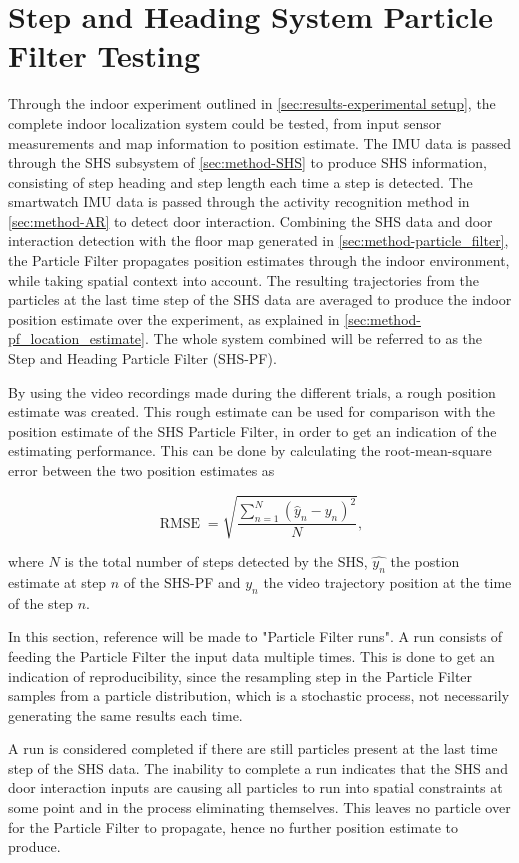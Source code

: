 \section[SHS-PF Testing]{Step and Heading System Particle Filter Testing}
\label{sec:results-SHSPF}
Through the indoor experiment outlined in \cref{sec:results-experimental setup}, the complete indoor localization system could be tested, from input sensor measurements and map information to position estimate. The IMU data is passed through the \ac{SHS} subsystem of \cref{sec:method-SHS} to produce \ac{SHS} information, consisting of step heading and step length each time a step is detected. The smartwatch IMU data is passed through the activity recognition method in \cref{sec:method-AR} to detect door interaction. Combining the \ac{SHS} data and door interaction detection with the floor map generated in \cref{sec:method-particle_filter}, the Particle Filter propagates position estimates through the indoor environment, while taking spatial context into account. The resulting trajectories from the particles at the last time step of the SHS data are averaged to produce the indoor position estimate over the experiment, as explained in \cref{sec:method-pf_location_estimate}. The whole system combined will be referred to as the Step and Heading Particle Filter (SHS-PF).  \par 

By using the video recordings made during the different trials, a rough position estimate was created. This rough estimate can be used for comparison with the position estimate of the \ac{SHS} Particle Filter, in order to get an indication of the estimating performance. This can be done by calculating the root-mean-square error between the two position estimates as

\begin{equation}
	\displaystyle \operatorname {RMSE} ={\sqrt {\frac {\sum _{n=1}^{N}({\hat {y}}_{n}-y_{n})^{2}}{N}}},
	\label{eq:RMSE}
\end{equation}

where $N$ is the total number of steps detected by the SHS, $\hat{y_n}$ the postion estimate at step $n$ of the SHS-PF and $y_n$ the video trajectory position at the time of the step $n$. \par 

In this section, reference will be made to "Particle Filter runs". A run consists of feeding the Particle Filter the input data multiple times. This is done to get an indication of reproducibility, since the resampling step in the Particle Filter samples from a particle distribution, which is a stochastic process, not necessarily generating the same results each time.\par 
A run is considered completed if there are still particles present at the last time step of the SHS data. The inability to complete a run indicates that the SHS and door interaction inputs are causing all particles to run into spatial constraints at some point and in the process eliminating themselves. This leaves no particle over for the Particle Filter to propagate, hence no further position estimate to produce.

